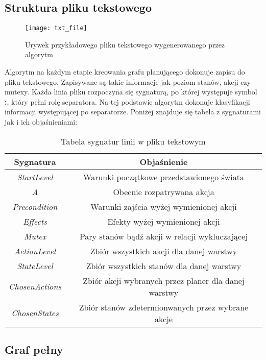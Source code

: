     \subsection{Struktura pliku tekstowego}
    \begin{figure}[H]
        \texttt{[image: txt\_file]}
        \centering
        \caption{Urywek przykładowego pliku tekstowego wygenerowanego przez algorytm}
    \end{figure}
    Algorytm na każdym etapie kreowania grafu planującego dokonuje zapisu do pliku tekstowego. Zapisywane są takie informacje jak poziom stanów, 
    akcji czy mutexy. Każda linia pliku rozpoczyna się sygnaturą, po której występuje symbol \textbf{:}, który pełni rolę separatora. 
    Na tej podstawie algorytm dokonuje klasyfikacji informacji występującej po separatorze. 
    Poniżej znajduje się tabela z sygnaturami jak i ich objaśnieniami:
    \begin{table}[H]
        \centering
         \begin{tabular}{||c | c||} 
         \hline
         Sygnatura & Objaśnienie \\ [0.5ex] 
         \hline\hline
         \textit{StartLevel} & Warunki początkowe przedstawionego świata \\ 
         \hline
         \textit{A} &  Obecnie rozpatrywana akcja \\
         \hline
         \textit{Precondition} & Warunki zajścia wyżej wymienionej akcji \\
         \hline
         \textit{Effects} & Efekty wyżej wymienionej akcji \\
         \hline
         \textit{Mutex} & Pary stanów bądź akcji w relacji wykluczającej \\ 
         \hline
         \textit{ActionLevel} & Zbiór wszystkich akcji dla danej warstwy \\ 
         \hline
         \textit{StateLevel} & Zbiór wszystkich stanów dla danej warstwy\\ 
         \hline
         \textit{ChosenActions} & Zbiór akcji wybranych przez planer dla danej warstwy\\ 
         \hline
         \textit{ChosenStates} & Zbiór stanów zdetermionwanych przez wybrane akcje\\ 
         \hline
         \end{tabular}
         \caption{Tabela sygnatur linii w pliku tekstowym}
    \end{table}

    \subsection{Graf pełny}

